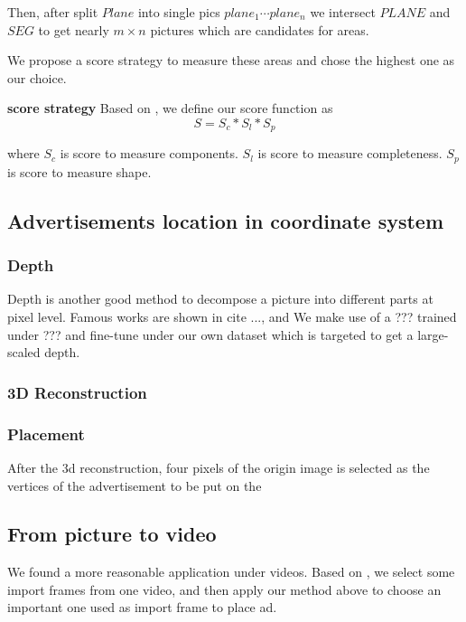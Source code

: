 \documentclass{sig-alternate}
\begin{document}
Then, after split $Plane$ into single pics $plane_1 \cdots plane_n$ we intersect $PLANE$ and $SEG$ to get nearly $m \times n$ pictures which are candidates for areas.


We propose a score strategy to measure these areas and chose the highest one as our choice.

\textbf{score strategy} Based on \cite{xxx}, we define our score function as 
$$S = S_c * S_l * S_p $$

where 
$S_c$ is score to measure components.
$S_l$ is score to measure completeness.
$S_p$ is score to measure shape.




\subsection{Advertisements location in coordinate system}

\subsubsection{Depth}
Depth is another good method to decompose a picture into different parts at pixel level. Famous works are shown in cite ..., and We make use of a ??? trained under ??? and fine-tune under our own dataset which is targeted to get a large-scaled depth. 

\subsubsection{3D Reconstruction}



\subsubsection{Placement}
After the 3d reconstruction, four pixels of the origin image is selected as the vertices of the advertisement to be put on the 

\subsection{From picture to video}

We found a more reasonable application under videos. Based on \cite{}, we select some import frames from one video, and then apply our method above to choose an important one used as import frame to place ad.
\end{document}
